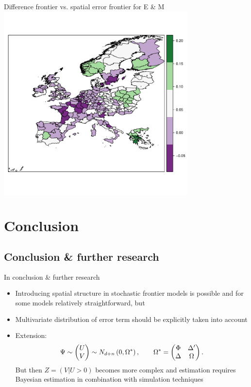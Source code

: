 \documentclass[presentation]{beamer}
\begin{document}
\begin{frame}{Difference frontier vs. spatial error frontier for E \& M}
\includegraphics[width=0.75\textwidth]{TEfrontierdiff}
\end{frame}

\section{Conclusion}

\subsection{Conclusion \& further research}

\begin{frame}{In conclusion \& further research}
\begin{itemize}
	\item Introducing spatial structure in stochastic frontier models is possible and for some models relatively straightforward, but
	\item Multivariate distribution of error term should be explicitly taken into account
	\item Extension:
	\begin{equation*}
		\Psi   \sim \begin{pmatrix} U \\ V \end{pmatrix} \sim N_{d+n}\left(0,\Omega^\ast\right), \qquad \Omega^\ast=\begin{pmatrix} \Phi & \Delta' \\ \Delta & \Omega \end{pmatrix}.\notag
	\end{equation*}
	But then $Z =( V|U>0)$ becomes more complex and estimation requires Bayesian estimation in combination with simulation techniques
\end{itemize}
\end{frame}
\end{document}
